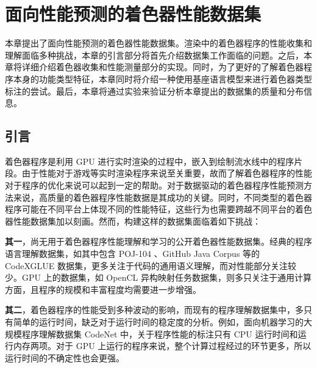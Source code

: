 
\chapter{面向性能预测的着色器性能数据集}
\label{sec:perf_data_set_chap}

{\added 本章提出了面向性能预测的着色器性能数据集。渲染中的着色器程序的性能收集和理解面临多种挑战，本章的引言部分将首先介绍数据集工作面临的问题。之后，本章将详细介绍着色器收集和性能测量部分的实现。同时，为了更好的了解着色器程序本身的功能类型特征，本章同时将介绍一种使用基座语言模型来进行着色器类型标注的尝试。最后，本章将通过实验来验证分析本章提出的数据集的质量和分布信息。}

\section{{\amend 引言}}

{\amend 着色器程序是利用 GPU 进行实时渲染的过程中，嵌入到绘制流水线中的程序片段。由于性能对于游戏等实时渲染程序来说至关重要，故而了解着色器程序的性能对于程序的优化来说可以起到一定的帮助。对于数据驱动的着色器程序性能预测方法来说，高质量的着色器程序性能数据是其成功的关键。同时，不同类型的着色器程序可能在不同平台上体现不同的性能特征，这些行为也需要跨越不同平台的着色器性能数据集加以刻画。然而，构建这样的数据集面临着如下挑战：

{\bf 其一}，尚无用于着色器程序性能理解和学习的公开着色器性能数据集。经典的程序语言理解数据集，如其中包含 POJ-104 \cite{10.5555/3015812.3016002}、GitHub Java Corpus 等的 CodeXGLUE 数据集\cite{DBLP:journals/corr/abs-2102-04664}，更多关注于代码的通用语义理解，而对性能部分关注较少。GPU 上的数据集，如 OpenCL 异构映射任务数据集\cite{8091247}，则多只关注于通用计算方面，且程序的规模和丰富程度均需要进一步增强。

{\bf 其二}，着色器程序的性能受到多种波动的影响，而现有的程序理解数据集中，多只有简单的运行时间，缺乏对于运行时间的稳定度的分析。例如，面向机器学习的大规模程序理解数据集 CodeNet \cite{DBLP:journals/corr/abs-2105-12655} 中，关于程序性能的标注只有 CPU 运行时间和运行内存两项。对于 GPU 上运行的程序来说，整个计算过程经过的环节更多，所以运行时间的不确定性也会更强。}

